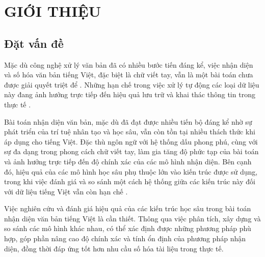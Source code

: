 
\chapter{GIỚI THIỆU} %

\label{Chapter1} %


\newcommand{\keyword}[1]{\textbf{#1}}
\newcommand{\tabhead}[1]{\textbf{#1}}
\newcommand{\code}[1]{\texttt{#1}}
\newcommand{\file}[1]{\texttt{\bfseries#1}}
\newcommand{\option}[1]{\texttt{\itshape#1}}


\section{Đặt vấn đề}

Mặc dù công nghệ xử lý văn bản đã có nhiều bước tiến đáng kể, việc nhận diện và số hóa văn bản tiếng Việt, đặc biệt là chữ viết tay, vẫn là một bài toán chưa được giải quyết triệt để \cite{Reference3}. Những hạn chế trong việc xử lý tự động các loại dữ liệu này đang ảnh hưởng trực tiếp đến hiệu quả lưu trữ và khai thác thông tin trong thực tế \cite{Reference3}.

Bài toán nhận diện văn bản, mặc dù đã đạt được nhiều tiến bộ đáng kể nhờ sự phát triển của trí tuệ nhân tạo và học sâu, vẫn còn tồn tại nhiều thách thức khi áp dụng cho tiếng Việt. Đặc thù ngôn ngữ với hệ thống dấu phong phú, cùng với sự đa dạng trong phong cách chữ viết tay, làm gia tăng độ phức tạp của bài toán và ảnh hưởng trực tiếp đến độ chính xác của các mô hình nhận diện. Bên cạnh đó, hiệu quả của các mô hình học sâu phụ thuộc lớn vào kiến trúc được sử dụng, trong khi việc đánh giá và so sánh một cách hệ thống giữa các kiến trúc này đối với dữ liệu tiếng Việt vẫn còn hạn chế \cite{Reference4}.

Việc nghiên cứu và đánh giá hiệu quả của các kiến trúc học sâu trong bài toán nhận diện văn bản tiếng Việt là cần thiết. Thông qua việc phân tích, xây dựng và so sánh các mô hình khác nhau, có thể xác định được những phương pháp phù hợp, góp phần nâng cao độ chính xác và tính ổn định của phương pháp­ nhận diện, đồng thời đáp ứng tốt hơn nhu cầu số hóa tài liệu trong thực tế.

